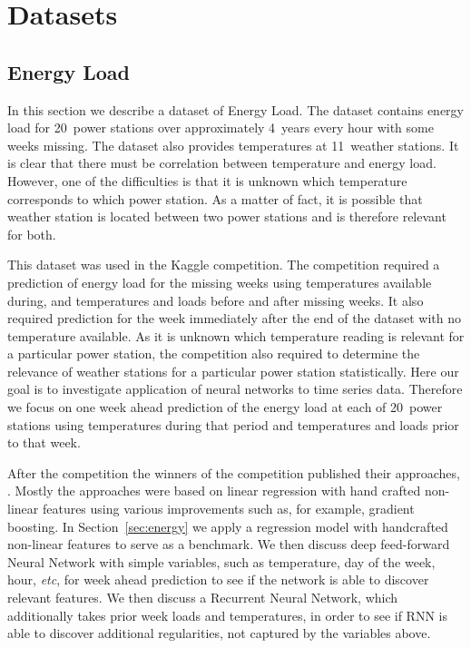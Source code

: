 \documentclass{article} %
\begin{document}
\section{Datasets}
\label{sec:data}


\subsection{Energy Load}
\label{sec:data/energy}

In this section we describe a dataset of Energy Load.
The dataset contains energy load for 20~power stations over approximately 4~years
every hour with some weeks missing. 
The dataset also provides temperatures at 11~weather stations. It is clear that
there must be correlation between temperature and energy load.
However, one of the difficulties is that it is unknown
which temperature corresponds to which power station. As a matter of fact, 
it is possible that weather station is located between two power stations
and is therefore relevant for both. 

This dataset was used in the Kaggle competition. 
The competition required a prediction of energy load for the missing weeks
using temperatures available during, and 
temperatures and loads before and after missing weeks. It also required 
prediction for the week immediately after the end of the dataset
with no temperature available. 
As it is unknown which temperature reading is relevant for a particular
power station, the competition also required to
determine the relevance of weather stations for a particular power station
statistically.
Here our goal is to investigate application of neural networks to time series data.
Therefore we focus on one week ahead prediction of the energy load 
at each of 20~power stations
using temperatures during that period and temperatures and loads prior to 
that week.

After the competition
the winners of the competition published their approaches, 
\cite{energy_kaggle}.
Mostly the approaches were based on linear regression with 
hand crafted non-linear features using various improvements
such as, for example, gradient boosting.
In Section~\ref{sec:energy} we apply a regression model with 
handcrafted non-linear features to serve as a benchmark.
We then discuss deep feed-forward Neural Network with simple
variables, such as temperature, day of the week, hour, {\it etc},
for week ahead prediction to see if the network is able to discover
relevant features. 
We then discuss a Recurrent Neural Network, which additionally takes
prior week loads and temperatures, in order to see if RNN is able to 
discover additional regularities, not captured by the variables above.
\end{document}
